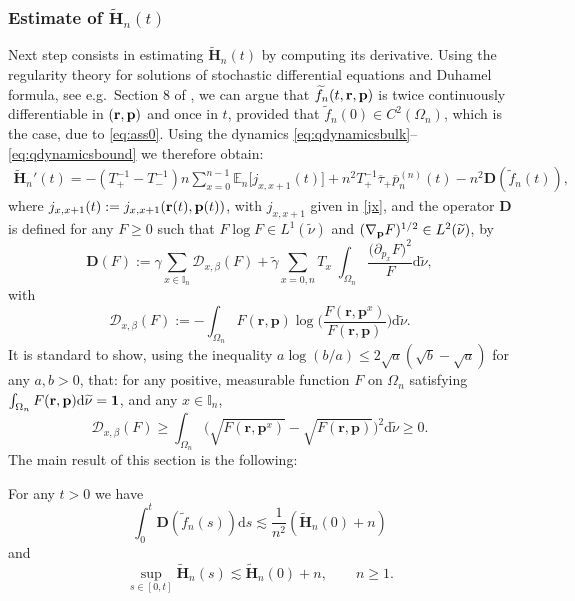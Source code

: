 \documentclass[EJP]{ejpecp} %
\newcommand{\mc}[1]{{\mathcal #1}}
\newcommand\bbE{{\mathbb E}}
\newcommand\T{{\mathbb I}}
\newcommand\Om{\Omega}
\renewcommand{\ge}{\geqslant}
\newcommand{\dd  }{\mathrm{d}}
\renewcommand{\tilde}{\widetilde}
\renewcommand{\bar}{\overline}
\numberwithin{equation}{section}
\begin{document}
\subsubsection{Estimate of $\tilde{\mathbf{H}}_{n}(t)$}
Next step consists in estimating $\tilde{\mathbf{H}}_{n}(t)$ by computing its derivative.
Using the regularity theory for solutions of stochastic differential
equations and Duhamel formula, see e.g.~Section 8 of \cite{bo2}, we
can argue that $\tilde f_n(t, {\bf r},{\bf p})$ is
twice continuously differentiable in $({\bf r},{\bf p})$ and once in
$t$,
provided that $\tilde f_n(0)\in C^2(\Om_n)$, which is the case, due to  \eqref{eq:ass0}. 
Using the dynamics \eqref{eq:qdynamicsbulk}--\eqref{eq:qdynamicsbound} we   therefore obtain:
\begin{align}
  \label{eq:10}
 \tilde{\mathbf{H}}_n'(t) 
=-\left(T_+^{-1} - T_-^{-1}\right) n\sum_{x=0}^{n-1}  \bbE_n\Big[ j_{x,x+1}(t)\Big]
+n^2 T_+^{-1} \bar\tau_+\bar p_n^{(n)}(t) - n^2 \mathbf D(\tilde f_n(t)),
\end{align}
where $j_{x,x+1} (t):= j_{x,x+1} ({\bf r}(t), {\bf p}(t))$, with $j_{x,x+1}$ given in \eqref{jx}, and
the operator $\mathbf{D}$ is defined for any $F\ge0$ such that
    $F\log F\in L^1(\tilde \nu)$ and $(\nabla_{\bf
    p}F)^{1/2}\in L^2(\tilde \nu)$, by
\begin{equation}
  \label{eq:11Dtilde}
  \mathbf D(F) := \gamma \sum_{x\in\T_n} {\mc D}_{x,\beta} (F) +\tilde\gamma  \sum_{x=0,n}
 T_x \; \int_{\Om_n}  \frac{\big(\partial_{p_x} F\big)^2}{F} \dd \tilde\nu,
\end{equation}
with
\begin{equation}  
    \mc D_{x,\beta}(F) := - \int_{\Om_n}F({\mathbf r},{\mathbf p}) \log\bigg(\frac{F({\mathbf r},{\mathbf p}^x
          )}{F({\mathbf r},{\mathbf p})} \bigg)\dd\tilde \nu.
    \end{equation} 
It is standard to show, using the inequality $a \log(b/a) \leqslant 2 \sqrt{a}(\sqrt b -\sqrt a)$ for any $a,b>0$, that: for any positive, measurable function $F$  on $\Omega_n$ satisfying $\int_{\Omega_n} F(\bf r,\bf p)\dd\tilde\nu=1$, and any $x \in \T_n$, 
\begin{equation} \mc D_{x,\beta}(F)  \geqslant \int_{\Om_n} \big(\sqrt{F({\mathbf r},{\mathbf
      p}^x)} - \sqrt{F({\mathbf r},{\mathbf p})}\big)^2 \dd\tilde \nu \geqslant 0. \label{eq:dirich-pos}
\end{equation}
%
The main result of this section is the following:
\begin{proposition}
\label{thm-entropy-production} 
For any $t>0$ we have
\begin{equation}
 \int_0^t \mathbf D(\tilde f_n(s))\dd s \lesssim \frac{1}{n^2}\left(\tilde{\mathbf{H}}_n(0) +n\right)\label{eq:88t}
\end{equation}
and
\begin{equation}
\sup_{s\in[0,t]}\tilde{\mathbf{H}}_n(s) \lesssim \tilde{\mathbf{H}}_n(0) + n, \qquad n\ge1.\label{eq:88tt}
\end{equation}
\end{proposition}
\end{document}
